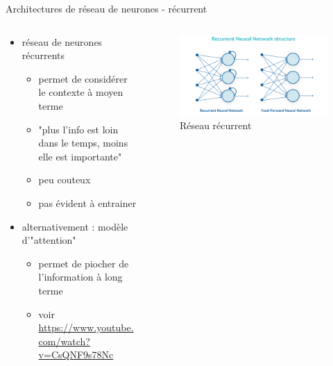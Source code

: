 \documentclass[9pt, aspectratio=169]{beamer}
\begin{document}
\begin{frame}{Architectures de réseau de neurones - récurrent} %
\begin{columns}
    \begin{column}{0.68\textwidth}

\begin{itemize}
	
	\item réseau de neurones récurrents
	\begin{itemize}
		\item permet de considérer le contexte à moyen terme
		\item "plus l'info est loin dans le temps, moins elle est importante"
		\item peu couteux
		\item pas évident à entrainer
	\end{itemize}
	
	\item<2-> alternativement : modèle d'"attention" \cite{lin_survey_2022}
	\begin{itemize}
		\item<2-> permet de piocher de l'information à long terme
		\item<2-> voir \url{https://www.youtube.com/watch?v=CsQNF9s78Nc}
	\end{itemize}
	\end{itemize}
	\end{column}
	\begin{column}{0.3\textwidth}
	\begin{figure}
		\includegraphics[width=.8\textwidth, trim=0 50 300 50, clip]{fig/rnn.png}
		\caption{Réseau récurrent}
	\end{figure}
	
    \end{column}
\end{columns}

\end{frame}
\end{document}
